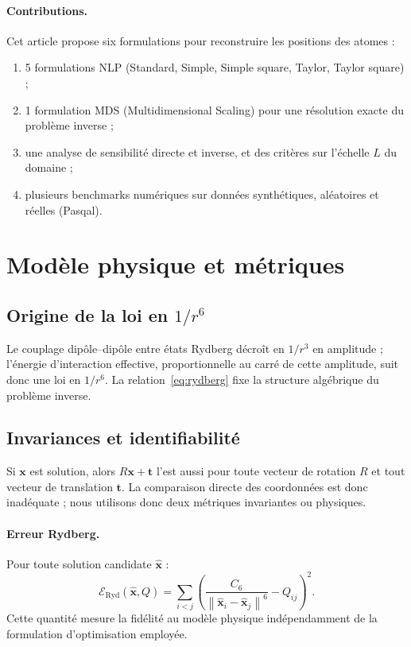 \documentclass[11pt,a4paper]{article}
\theoremstyle{definition}
\theoremstyle{remark}
\newcommand{\norm}[1]{\left\|#1\right\|}
\newcommand{\Eryd}{\mathcal{E}_{\mathrm{Ryd}}}
\newcommand{\cSix}{C_6}
\begin{document}
\paragraph{Contributions.}
Cet article propose six formulations pour reconstruire les positions des atomes :
\begin{enumerate}[leftmargin=*, itemsep=2pt]
  \item 5 formulations NLP (Standard, Simple, Simple square, Taylor, Taylor square) ;
  \item 1 formulation MDS (Multidimensional Scaling) pour une résolution exacte du problème inverse ;
  \item une analyse de sensibilité directe et inverse, et des critères sur
        l'échelle $L$ du domaine ;
  \item plusieurs benchmarks numériques sur données synthétiques, aléatoires et réelles (Pasqal).
\end{enumerate}

\section{Modèle physique et métriques}
\label{sec:modele}

\subsection{Origine de la loi en $1/r^6$}
Le couplage dipôle--dipôle entre états Rydberg décroît en $1/r^3$ en
amplitude ; l'énergie d'interaction effective, proportionnelle au carré de
cette amplitude, suit donc une loi en $1/r^6$. La relation~\eqref{eq:rydberg}
fixe la structure algébrique du problème inverse.

\subsection{Invariances et identifiabilité}
Si $\mathbf{x}$ est solution, alors $R\mathbf{x} + \mathbf{t}$ l'est aussi
pour toute vecteur de rotation $R$ et tout vecteur de translation $\mathbf{t}$.
La comparaison directe des coordonnées est donc inadéquate ; nous utilisons donc
deux métriques invariantes ou physiques.

\paragraph{Erreur Rydberg.}
Pour toute solution candidate $\hat{\mathbf{x}}$ :
\begin{equation}
  \Eryd(\hat{\mathbf{x}}, Q)
  = \sum_{i<j}\left(\frac{\cSix}{\norm{\hat{\mathbf{x}}_i-\hat{\mathbf{x}}_j}^6} - Q_{ij}\right)^2.
\end{equation}
Cette quantité mesure la fidélité au modèle physique indépendamment de la
formulation d'optimisation employée.
\end{document}
